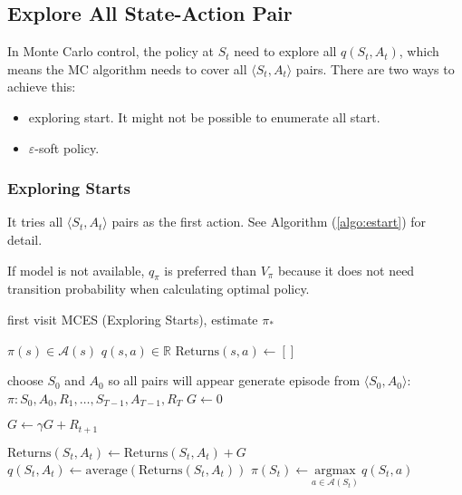 \subsection{Explore All State-Action Pair}

In Monte Carlo control, the policy at $S_t$ need to explore all $q(S_t,A_t)$, which means the MC algorithm needs to cover all $\langle S_t, A_t \rangle$ pairs. There are two ways to achieve this:

\begin{itemize}
	\item exploring start. It might not be possible to enumerate all start.
	\item $\varepsilon$-soft policy.
\end{itemize}

\subsubsection{Exploring Starts}

It tries all $\langle S_t, A_t \rangle$ pairs as the first action. See Algorithm (\ref{algo:estart}) for detail.

If model is not available, $q_\pi$ is preferred than $V_\pi$ because it does not need transition probability when calculating optimal policy. 


\begin{algorithm}
	\caption{first visit MCES (Exploring Starts), estimate $\pi_*$}\label{algo:estart}	
	
	\begin{algorithmic}[1]
		\State $\pi(s) \in \mathcal{A}(s)$
		\State $q(s,a) \in \mathbb{R}$
		\State $\text{Returns}(s,a) \gets []$
		
		\Statex
		
		\Loop
			\State choose $S_0$ and $A_0$ so all pairs will appear 
			\State generate episode from $\langle S_0,A_0 \rangle$: $\pi: S_0, A_0, R_1,\dots, S_{T-1}, A_{T-1}, R_T$
			\State $G \gets 0$
			
				\State $G \gets \gamma G + R_{t+1}$
				
					\State $\text{Returns}(S_t, A_t) \gets \text{Returns}(S_t, A_t) + G$
					\State $q(S_t, A_t) \gets \text{average}(\text{Returns}(S_t, A_t))$
					\State $\pi (S_t) \gets \underset{a \in \mathcal{A}(S_t)}{\text{argmax}}\ q(S_t, a) $
				\EndIf
			\EndFor
		\EndLoop
	\end{algorithmic}
\end{algorithm}

